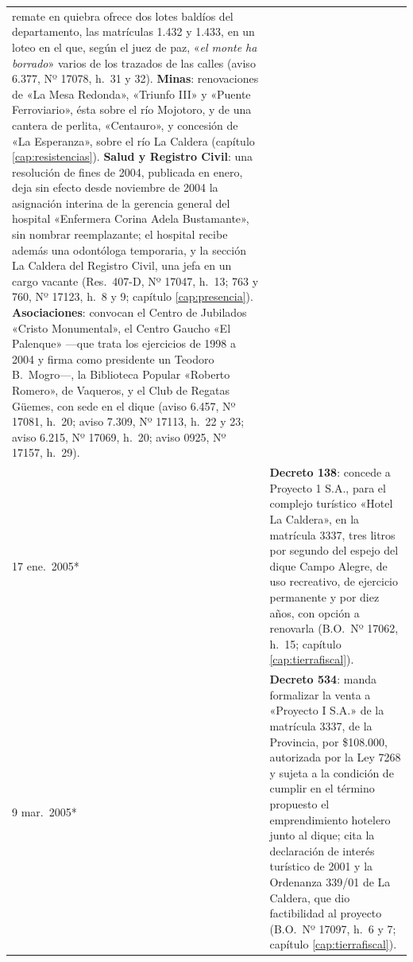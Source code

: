 \begin{longtable}{@{}p{2.7cm}p{10.3cm}@{}}
remate en quiebra ofrece dos lotes baldíos del departamento, las matrículas 1.432 y 1.433, en un loteo en el que, según el juez de paz, «\textit{el monte ha borrado}» varios de los trazados de las calles (aviso 6.377, Nº 17078, h.\ 31 y 32). \textbf{Minas}: renovaciones de «La Mesa Redonda», «Triunfo III» y «Puente Ferroviario», ésta sobre el río Mojotoro, y de una cantera de perlita, «Centauro», y concesión de «La Esperanza», sobre el río La Caldera (capítulo \ref{cap:resistencias}). \textbf{Salud y Registro Civil}: una resolución de fines de 2004, publicada en enero, deja sin efecto desde noviembre de 2004 la asignación interina de la gerencia general del hospital «Enfermera Corina Adela Bustamante», sin nombrar reemplazante; el hospital recibe además una odontóloga temporaria, y la sección La Caldera del Registro Civil, una jefa en un cargo vacante (Res.\ 407-D, Nº 17047, h.\ 13; 763 y 760, Nº 17123, h.\ 8 y 9; capítulo \ref{cap:presencia}). \textbf{Asociaciones}: convocan el Centro de Jubilados «Cristo Monumental», el Centro Gaucho «El Palenque» ---que trata los ejercicios de 1998 a 2004 y firma como presidente un Teodoro B.\ Mogro---, la Biblioteca Popular «Roberto Romero», de Vaqueros, y el Club de Regatas Güemes, con sede en el dique (aviso 6.457, Nº 17081, h.\ 20; aviso 7.309, Nº 17113, h.\ 22 y 23; aviso 6.215, Nº 17069, h.\ 20; aviso 0925, Nº 17157, h.\ 29). \\
17 ene.\ 2005* & \textbf{Decreto 138}: concede a Proyecto 1 S.A., para el complejo turístico «Hotel La Caldera», en la matrícula 3337, tres litros por segundo del espejo del dique Campo Alegre, de uso recreativo, de ejercicio permanente y por diez años, con opción a renovarla (B.O.\ Nº 17062, h.\ 15; capítulo \ref{cap:tierrafiscal}). \\
9 mar.\ 2005* & \textbf{Decreto 534}: manda formalizar la venta a «Proyecto I S.A.» de la matrícula 3337, de la Provincia, por \$108.000, autorizada por la Ley 7268 y sujeta a la condición de cumplir en el término propuesto el emprendimiento hotelero junto al dique; cita la declaración de interés turístico de 2001 y la Ordenanza 339/01 de La Caldera, que dio factibilidad al proyecto (B.O.\ Nº 17097, h.\ 6 y 7; capítulo \ref{cap:tierrafiscal}). \\

\end{longtable}
